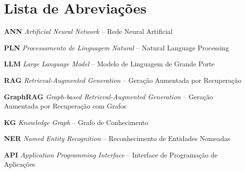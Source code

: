 \chapter*{Lista de Abreviações}

\begin{description}
    \item \textbf{ANN} \quad \textit{Artificial Neural Network} – Rede Neural Artificial
    \item \textbf{PLN} \quad \textit{Processamento de Linguagem Natural} – Natural Language Processing
    \item \textbf{LLM} \quad \textit{Large Language Model} – Modelo de Linguagem de Grande Porte
    \item \textbf{RAG} \quad \textit{Retrieval-Augmented Generation} – Geração Aumentada por Recuperação
    \item \textbf{GraphRAG} \quad \textit{Graph-based Retrieval-Augmented Generation} – Geração Aumentada por Recuperação com Grafos
    \item \textbf{KG} \quad \textit{Knowledge Graph} – Grafo de Conhecimento
    \item \textbf{NER} \quad \textit{Named Entity Recognition} – Reconhecimento de Entidades Nomeadas
    \item \textbf{API} \quad \textit{Application Programming Interface} – Interface de Programação de Aplicações
\end{description}
